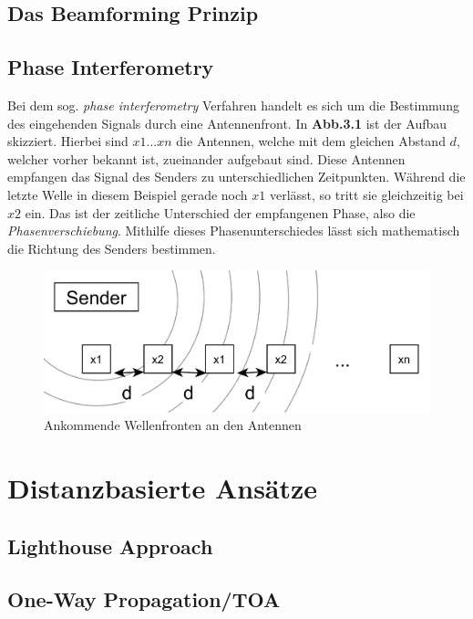 \documentclass[12pt, a4wide]{scrreprt}
\begin{document}
    \subsection{Das Beamforming Prinzip}

\newpage
    \subsection{Phase Interferometry}
Bei dem sog. \textit{phase interferometry}\cite{q1} Verfahren handelt es sich um die Bestimmung des eingehenden Signals durch eine Antennenfront. In {\bf Abb.3.1} ist der Aufbau skizziert. Hierbei sind $x1...xn$ die Antennen, welche mit dem gleichen Abstand $d$, welcher vorher bekannt ist, zueinander aufgebaut sind. Diese Antennen empfangen das Signal des Senders zu unterschiedlichen Zeitpunkten. Während die letzte Welle in diesem Beispiel gerade noch $x1$ verlässt, so tritt sie gleichzeitig bei $x2$ ein. Das ist der zeitliche Unterschied der empfangenen Phase, also die \textit{Phasenverschiebung}. Mithilfe dieses Phasenunterschiedes lässt sich mathematisch die Richtung des Senders bestimmen.\\

\begin{figure}[!htb]
\centering
\includegraphics[scale=.3]{phase_int2.png}
\caption{Ankommende Wellenfronten an den Antennen}

\end{figure}

  \section{Distanzbasierte Ansätze}
    \subsection{Lighthouse Approach}
    \subsection{One-Way Propagation/TOA}
\end{document}

